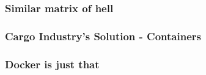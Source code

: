 \documentclass[mathserif,serif]{beamer}
\begin{document}
    \begin{frame}
        \frametitle{Similar matrix of hell}
        \begin{center}
        \end{center}
    \end{frame}

    \begin{frame}
        \frametitle{Cargo Industry's Solution - Containers}
        \begin{center}
        \end{center}
    \end{frame}

    \begin{frame}
        \frametitle{Docker is just that}
        \begin{center}
        \end{center}
    \end{frame}
\end{document}
